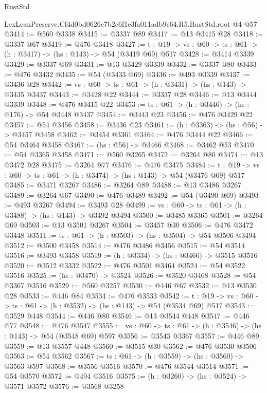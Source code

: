 \begin{lexlean}{RustStd}
\begin{coremodule}
  LexLeanPreserve.Cf4d0bd0626c7b2c6f1e3fa011adb9c64.R5.RustStd.root @4 @57
@3414 := @560 @3338
@3415 := @3337 @89
@3417 := @13 @3415 @28
@3418 := @3337 @67
@3419 := @476 @3418
@3427 := {t : @19} -> {vs : @60} -> {ts : @61} -> (h : @3417) -> (hs : @143) -> @54 (@3419 @69) @517
@3428 := @3414 @3339
@3429 := @3337 @69
@3431 := @13 @3429 @3339
@3432 := @3337 @80
@3433 := @476 @3432
@3435 := @54 (@3433 @69)
@3436 := @493 @3339
@3437 := @3436 @28
@3442 := {vs : @60} -> {ts : @61} -> (h : @3431) -> (hs : @143) -> @3435 @3437
@3443 := @3428 @22
@3444 := @3337 @28
@3446 := @13 @3444 @3339
@3448 := @476 @3415 @22
@3453 := {ts : @61} -> (h : @3446) -> (hs : @176) -> @54 @3448 @3437
@3454 := @3443 @23
@3456 := @476 @3429 @22
@3457 := @54 @3456
@3458 := @3436 @23
@3461 := (h : @3363) -> (hs : @56) -> @3457 @3458
@3462 := @3454 @3361
@3464 := @476 @3444 @22
@3466 := @54 @3464 @3458
@3467 := (hs : @56) -> @3466
@3468 := @3462 @53
@3470 := @54 @3365 @3458
@3471 := @560 @3265
@3472 := @3264 @80
@3474 := @13 @3472 @28
@3475 := @3264 @77
@3476 := @476 @3475
@3484 := {t : @19} -> {vs : @60} -> {ts : @61} -> (h : @3474) -> (hs : @143) -> @54 (@3476 @69) @517
@3485 := @3471 @3267
@3486 := @3264 @89
@3488 := @13 @3486 @3267
@3489 := @3264 @67
@3490 := @476 @3489
@3492 := @54 (@3490 @69)
@3493 := @493 @3267
@3494 := @3493 @28
@3499 := {vs : @60} -> {ts : @61} -> (h : @3488) -> (hs : @143) -> @3492 @3494
@3500 := @3485 @3365
@3501 := @3264 @69
@3503 := @13 @3501 @3267
@3504 := @3457 @30
@3506 := @476 @3472 @3448
@3511 := {ts : @61} -> (h : @3503) -> (hs : @3504) -> @54 @3506 @3494
@3512 := @3500 @3458
@3514 := @476 @3486 @3456
@3515 := @54 @3514
@3516 := @3493 @3458
@3519 := (h : @3334) -> (hs : @3466) -> @3515 @3516
@3520 := @3512 @3332
@3522 := @476 @3501 @3464
@3524 := @54 @3522 @3516
@3525 := (hs : @3470) -> @3524
@3526 := @3520 @3468
@3528 := @54 @3367 @3516
@3529 := @560 @3257
@3530 := @446 @67
@3532 := @13 @3530 @28
@3533 := @446 @84
@3534 := @476 @3533
@3542 := {t : @19} -> {vs : @60} -> {ts : @61} -> (h : @3532) -> (hs : @143) -> @54 (@3534 @69) @517
@3543 := @3529 @448
@3544 := @446 @80
@3546 := @13 @3544 @448
@3547 := @446 @77
@3548 := @476 @3547
@3555 := {vs : @60} -> {ts : @61} -> (h : @3546) -> (hs : @143) -> @54 (@3548 @69) @597
@3556 := @3543 @3367
@3557 := @446 @89
@3559 := @13 @3557 @448
@3560 := @3515 @30
@3562 := @476 @3530 @3506
@3563 := @54 @3562
@3567 := {ts : @61} -> (h : @3559) -> (hs : @3560) -> @3563 @597
@3568 := @3556 @3516
@3570 := @476 @3544 @3514
@3571 := @54 @3570
@3572 := @494 @3516
@3575 := (h : @3260) -> (hs : @3524) -> @3571 @3572
@3576 := @3568 @3258

\end{coremodule}
\end{lexlean}
